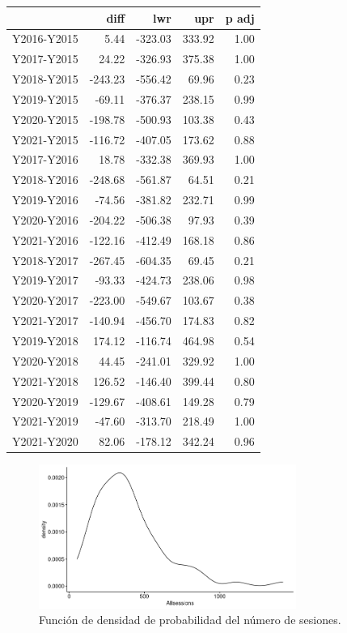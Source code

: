 \begin{table}[H]
\centering
\begin{tabular}{rrrrr}
  \hline
 & diff & lwr & upr & p adj \\ 
  \hline
Y2016-Y2015 & 5.44 & -323.03 & 333.92 & 1.00 \\ 
  Y2017-Y2015 & 24.22 & -326.93 & 375.38 & 1.00 \\ 
  Y2018-Y2015 & -243.23 & -556.42 & 69.96 & 0.23 \\ 
  Y2019-Y2015 & -69.11 & -376.37 & 238.15 & 0.99 \\ 
  Y2020-Y2015 & -198.78 & -500.93 & 103.38 & 0.43 \\ 
  Y2021-Y2015 & -116.72 & -407.05 & 173.62 & 0.88 \\ 
  Y2017-Y2016 & 18.78 & -332.38 & 369.93 & 1.00 \\ 
  Y2018-Y2016 & -248.68 & -561.87 & 64.51 & 0.21 \\ 
  Y2019-Y2016 & -74.56 & -381.82 & 232.71 & 0.99 \\ 
  Y2020-Y2016 & -204.22 & -506.38 & 97.93 & 0.39 \\ 
  Y2021-Y2016 & -122.16 & -412.49 & 168.18 & 0.86 \\ 
  Y2018-Y2017 & -267.45 & -604.35 & 69.45 & 0.21 \\ 
  Y2019-Y2017 & -93.33 & -424.73 & 238.06 & 0.98 \\ 
  Y2020-Y2017 & -223.00 & -549.67 & 103.67 & 0.38 \\ 
  Y2021-Y2017 & -140.94 & -456.70 & 174.83 & 0.82 \\ 
  Y2019-Y2018 & 174.12 & -116.74 & 464.98 & 0.54 \\ 
  Y2020-Y2018 & 44.45 & -241.01 & 329.92 & 1.00 \\ 
  Y2021-Y2018 & 126.52 & -146.40 & 399.44 & 0.80 \\ 
  Y2020-Y2019 & -129.67 & -408.61 & 149.28 & 0.79 \\ 
  Y2021-Y2019 & -47.60 & -313.70 & 218.49 & 1.00 \\ 
  Y2021-Y2020 & 82.06 & -178.12 & 342.24 & 0.96 \\ 
   \hline
\end{tabular}
\end{table}

\begin{figure}[H]
    \centering
    \includegraphics[width=0.75\textwidth]{imagenes/allsessions/Rplot04.png}
    \caption{Función de densidad de probabilidad del número de sesiones.}
    \label{fig:densitysessions}
\end{figure}

